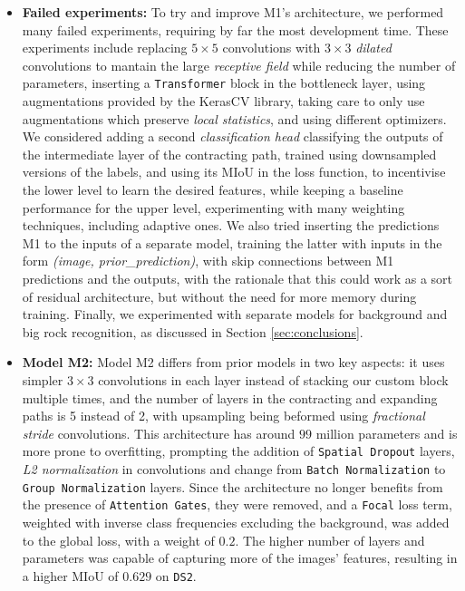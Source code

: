 \documentclass[11pt]{article}
\begin{document}
\begin{multicols}{2}
\begin{itemize}[leftmargin=*]
            \item \textbf{Failed experiments:} To try and improve M1's architecture, we performed many failed experiments, requiring by far the most development time. These experiments include replacing $5\times5$ convolutions with $3\times3$ \textit{dilated} convolutions to mantain the large \textit{receptive field} while reducing the number of parameters, inserting a \texttt{Transformer} %
            block in the bottleneck layer, using augmentations provided by the KerasCV library, taking care to only use augmentations which preserve \textit{local statistics}, and using different optimizers. We considered adding a second \textit{classification head} classifying the outputs of the intermediate layer of the contracting path, trained using downsampled versions of the labels, and using its MIoU in the loss function, to incentivise the lower level to learn the desired features, while keeping a baseline performance for the upper level, experimenting with many weighting techniques, including adaptive ones. We also tried inserting the predictions M1 to the inputs of a separate model, training the latter with inputs in the form \textit{(image, prior\_prediction)}, with skip connections between M1 predictions and the outputs, with the rationale that this could work as a sort of residual architecture, but without the need for more memory during training. Finally, we experimented with separate models for background and big rock recognition, as discussed in Section \ref{sec:conclusions}.
            \item \textbf{Model M2:} Model M2 differs from prior models in two key aspects: it uses simpler $3\times3$ convolutions in each layer instead of stacking our custom block multiple times, and the number of layers in the contracting and expanding paths is 5 instead of 2, with upsampling being beformed using \textit{fractional stride} convolutions. This architecture has around $99$ million parameters and is more prone to overfitting, prompting the addition of \texttt{Spatial Dropout} layers, \textit{L2 normalization} in convolutions and change from \texttt{Batch Normalization} to \texttt{Group Normalization} layers. Since the architecture no longer benefits from the presence of \texttt{Attention Gates}, they were removed, and a \texttt{Focal} loss term, weighted with inverse class frequencies excluding the background, was added to the global loss, with a weight of $0.2$. The higher number of layers and parameters was capable of capturing more of the images' features, resulting in a higher MIoU of $0.629$ on \texttt{DS2}.
      \end{itemize}


\end{multicols}
\end{document}
